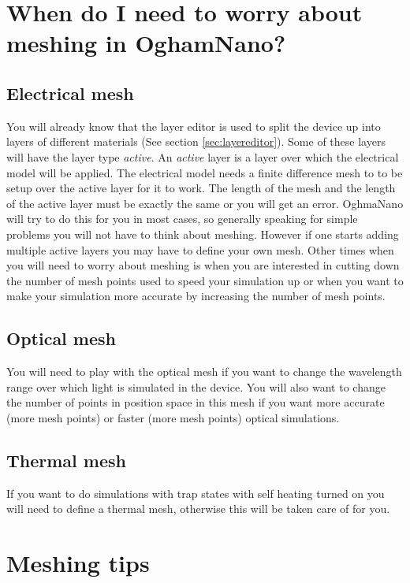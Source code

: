 \pagebreak
\section{When do I need to worry about meshing in OghamNano?}
\subsection{Electrical mesh}
You will already know that the layer editor is used to split the device up into layers of different materials (See section \ref{sec:layereditor}).  Some of these layers will have the layer type \emph{active}.  An \emph{active} layer is a layer over which the electrical model will be applied.  The electrical model needs a finite difference mesh to to be setup over the active layer for it to work. The length of the mesh and the length of the active layer must be exactly the same or you will get an error.  OghmaNano will try to do this for you in most cases, so generally speaking for simple problems you will not have to think about meshing. However if one starts adding multiple active layers you may have to define your own mesh. Other times when you will need to worry about meshing is when you are interested in cutting down the number of mesh points used to speed your simulation up or when you want to make your simulation more accurate by increasing the number of mesh points.

\subsection{Optical mesh}
You will need to play with the optical mesh if you want to change the wavelength range over which light is simulated in the device. You will also want to change the number of points in position space in this mesh if you want more accurate (more mesh points) or faster (more mesh points) optical simulations.

\subsection{Thermal mesh}
If you want to do simulations with trap states with self heating turned on you will need to define a thermal mesh, otherwise this will be taken care of for you.

\pagebreak
\section{Meshing tips}

